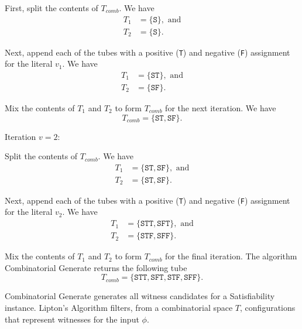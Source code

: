 First, split the contents of $T_{comb}$.  We have
\begin{align*}
 T_1 &= \{ \texttt{S} \}, \text{ and} \\
 T_2 &= \{ \texttt{S} \}.
\end{align*}

Next, append each of the tubes with a positive (\texttt{T}) and negative (\texttt{F}) assignment for the literal $v_1$.  We have
\begin{align*}
 T_1 &= \{ \texttt{ST} \}, \text{ and} \\
 T_2 &= \{ \texttt{SF} \}.
\end{align*}

Mix the contents of $T_1$ and $T_2$ to form $T_{comb}$ for the next iteration.  We have
\[
T_{comb} = \{\texttt{ST}, \texttt{SF}\}.
\]

\noindent Iteration $v = 2$:

Split the contents of $T_{comb}$.  We have
\begin{align*}
 T_1 &= \{\texttt{ST}, \texttt{SF}\}, \text{ and} \\
 T_2 &= \{\texttt{ST}, \texttt{SF}\}.
\end{align*}

Next, append each of the tubes with a positive (\texttt{T}) and negative (\texttt{F}) assignment for the literal $v_2$.  We have
\begin{align*}
 T_1 &= \{\texttt{STT}, \texttt{SFT}\}, \text{ and} \\
 T_2 &= \{\texttt{STF}, \texttt{SFF}\}.
\end{align*}

Mix the contents of $T_1$ and $T_2$ to form $T_{comb}$ for the final iteration.  The algorithm {\sc Combinatorial Generate} returns the following tube
\[
T_{comb} = \{\texttt{STT}, \texttt{SFT}, \texttt{STF}, \texttt{SFF}\}.
\]


{\sc Combinatorial Generate} generates all witness candidates for a {\sc Satisfiability} instance.  {\sc Lipton's Algorithm} filters, from a combinatorial space $T$, configurations that represent witnesses for the input $\phi$.



